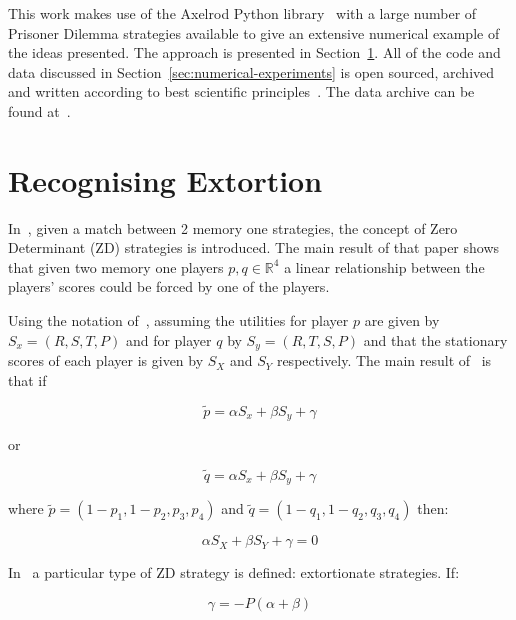 \documentclass[a4paper]{article}
\begin{document}
This work makes use of the Axelrod Python library~\cite{Knight2016, Knight2018}
with a large number of Prisoner Dilemma strategies available to give an
extensive numerical example of the ideas presented.  The approach is presented
in Section~\ref{sec:delta-zd-strategies}.  All of the code and data discussed
in Section~\ref{sec:numerical-experiments} is open sourced, archived and
written according to best scientific principles~\cite{Wilson2014}. The data
archive can be found at~\cite{vincent_knight_2018_1297075}.

\section{Recognising Extortion}\label{sec:delta-zd-strategies}

In~\cite{Press2012}, given a match between 2 memory one strategies, the concept
of Zero Determinant (ZD) strategies is introduced. The main result of that paper
shows that given two memory one players \(p, q\in\mathbb{R}^4\) a linear
relationship between the players' scores could be forced by one of the players.

Using the notation of~\cite{Press2012}, assuming the utilities for player \(p\)
are given by \(S_x=(R, S, T, P)\) and for player \(q\) by \(S_y=(R, T, S, P)\)
and that the stationary scores of each player is given by \(S_X\) and \(S_Y\)
respectively. The main result of~\cite{Press2012} is that if

\begin{equation}\label{eqn:linear_relationship_for_p}
    \tilde p=\alpha S_x + \beta S_y + \gamma
\end{equation}

or

\begin{equation}\label{eqn:linear_relationship_for_q}
    \tilde q=\alpha S_x + \beta S_y + \gamma
\end{equation}

where \(\tilde p = (1 - p_1, 1 - p_2, p_3, p_4)\) and
\(\tilde q = (1 - q_1, 1 - q_2, q_3, q_4)\) then:

\begin{equation}
    \alpha S_X + \beta S_Y + \gamma = 0
\end{equation}

In~\cite{Press2012} a particular type of ZD strategy is defined: extortionate
strategies. If:

\begin{equation}\label{eqn:constraint_for_extortion}
    \gamma = - P(\alpha + \beta)
\end{equation}
\end{document}
